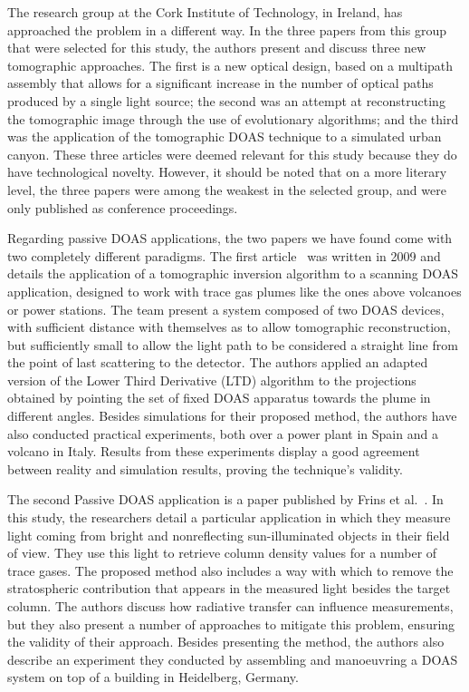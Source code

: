 The research group at the Cork Institute of Technology, in Ireland, has
approached the problem in a different way. In the three papers from this
group~\cite{Murphy2003, ODriscoll2003, ODriscoll2003a} that were
selected for this study, the authors present and discuss three new
tomographic approaches. The first is a new optical design, based on a
multipath assembly that allows for a significant increase in the number
of optical paths produced by a single light source; the second was an
attempt at reconstructing the tomographic image through the use of
evolutionary algorithms; and the third was the application of the
tomographic DOAS technique to a simulated urban canyon. These three
articles were deemed relevant for this study because they do have
technological novelty. However, it should be noted that on a more
literary level, the three papers were among the weakest in the selected
group, and were only published as conference proceedings.


Regarding passive DOAS applications, the two papers we have found come
with two completely different paradigms. The first
article~\cite{Johansson2009} was written in 2009 and details the
application of a tomographic inversion algorithm to a scanning DOAS
application, designed to work with trace gas plumes like the ones above
volcanoes or power stations. The team present a system composed of two
DOAS devices, with sufficient distance with themselves as to allow
tomographic reconstruction, but sufficiently small to allow the light
path to be considered a straight line from the point of last scattering
to the detector. The authors applied an adapted version of the Lower
Third Derivative (LTD) algorithm to the projections obtained by pointing
the set of fixed DOAS apparatus towards the plume in different angles.
Besides simulations for their proposed method, the authors have also
conducted practical experiments, both over a power plant in Spain and a
volcano in Italy. Results from these experiments display a good
agreement between reality and simulation results, proving the
technique's validity.

The second Passive DOAS application is a paper published by Frins et
al.~\cite{Frins2006}. In this study, the researchers detail a particular
application in which they measure light coming from bright and
nonreflecting sun-illuminated objects in their field of view. They use
this light to retrieve column density values for a number of trace
gases. The proposed method also includes a way with which to remove the
stratospheric contribution that appears in the measured light besides
the target column. The authors discuss how radiative transfer can
influence measurements, but they also present a number of approaches to
mitigate this problem, ensuring the validity of their approach.  Besides
presenting the method, the authors also describe an experiment they
conducted by assembling and manoeuvring a DOAS system on top of a
building in Heidelberg, Germany.
 
